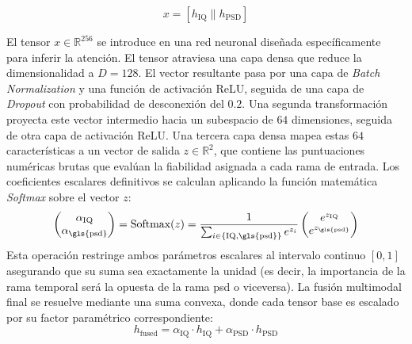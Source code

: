 \begin{equation}
    x = \left[ h_{\text{IQ}} \parallel h_{\text{PSD}} \right]
\end{equation}

El tensor $x \in \mathbb{R}^{256}$ se introduce en una red neuronal diseñada específicamente para inferir la atención. El tensor atraviesa una capa densa que reduce la dimensionalidad a $D=128$. El vector resultante pasa por una capa de \textit{Batch Normalization} y una función de activación ReLU, seguida de una capa de \textit{Dropout} con probabilidad de desconexión del $0.2$. Una segunda transformación proyecta este vector intermedio hacia un subespacio de $64$ dimensiones, seguida de otra capa de activación ReLU. Una tercera capa densa mapea estas $64$ características a un vector de salida $z \in \mathbb{R}^{2}$, que contiene las puntuaciones numéricas brutas que evalúan la fiabilidad asignada a cada rama de entrada.
Los coeficientes escalares definitivos se calculan aplicando la función matemática \textit{Softmax} sobre el vector $z$:
\begin{equation}
    \begin{pmatrix} \alpha_{\text{IQ}} \\ \alpha_{\text{\gls{psd}}} \end{pmatrix} = \text{Softmax}(z) = \frac{1}{\sum_{i \in \{\text{IQ}, \text{\gls{psd}}\}} e^{z_i}} \begin{pmatrix} e^{z_{\text{IQ}}} \\ e^{z_{\text{\gls{psd}}}} \end{pmatrix}
\end{equation}
Esta operación restringe ambos parámetros escalares al intervalo continuo $[0, 1]$ asegurando que su suma sea exactamente la unidad (es decir, la importancia de la rama temporal será la opuesta de la rama \gls{psd} o viceversa). La fusión multimodal final se resuelve mediante una suma convexa, donde cada tensor base es escalado por su factor paramétrico correspondiente:
\begin{equation}
    h_{\text{fused}} = \alpha_{\text{IQ}} \cdot h_{\text{IQ}} + \alpha_{\text{PSD}} \cdot h_{\text{PSD}}
\end{equation}

